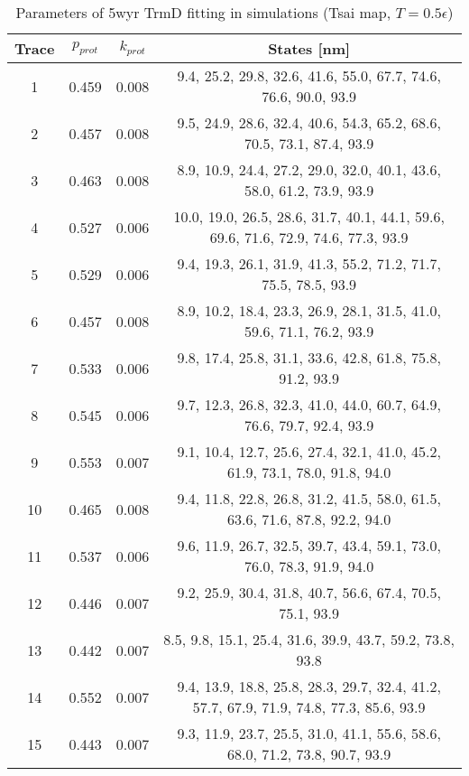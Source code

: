 \begin{table}
    \tiny
    \centering
    \caption{Parameters of 5wyr TrmD fitting in simulations (Tsai map, $T=0.5\epsilon$)}
    \label{tab:5wyr-pa-parameters}
    \begin{tabular}{c|c|c|c}
        \textbf{Trace} & \textbf{$p_{prot}$} & \textbf{$k_{prot}$} & \textbf{States [nm]}\\\hline
        1 & 0.459 & 0.008 & 9.4, 25.2, 29.8, 32.6, 41.6, 55.0, 67.7, 74.6, 76.6, 90.0, 93.9\\
        2 & 0.457 & 0.008 & 9.5, 24.9, 28.6, 32.4, 40.6, 54.3, 65.2, 68.6, 70.5, 73.1, 87.4, 93.9\\
        3 & 0.463 & 0.008 & 8.9, 10.9, 24.4, 27.2, 29.0, 32.0, 40.1, 43.6, 58.0, 61.2, 73.9, 93.9\\
        4 & 0.527 & 0.006 & 10.0, 19.0, 26.5, 28.6, 31.7, 40.1, 44.1, 59.6, 69.6, 71.6, 72.9, 74.6, 77.3, 93.9\\
        5 & 0.529 & 0.006 & 9.4, 19.3, 26.1, 31.9, 41.3, 55.2, 71.2, 71.7, 75.5, 78.5, 93.9\\
        6 & 0.457 & 0.008 & 8.9, 10.2, 18.4, 23.3, 26.9, 28.1, 31.5, 41.0, 59.6, 71.1, 76.2, 93.9\\
        7 & 0.533 & 0.006 & 9.8, 17.4, 25.8, 31.1, 33.6, 42.8, 61.8, 75.8, 91.2, 93.9\\
        8 & 0.545 & 0.006 & 9.7, 12.3, 26.8, 32.3, 41.0, 44.0, 60.7, 64.9, 76.6, 79.7, 92.4, 93.9\\
        9 & 0.553 & 0.007 & 9.1, 10.4, 12.7, 25.6, 27.4, 32.1, 41.0, 45.2, 61.9, 73.1, 78.0, 91.8, 94.0\\
        10 & 0.465 & 0.008 & 9.4, 11.8, 22.8, 26.8, 31.2, 41.5, 58.0, 61.5, 63.6, 71.6, 87.8, 92.2, 94.0\\
        11 & 0.537 & 0.006 & 9.6, 11.9, 26.7, 32.5, 39.7, 43.4, 59.1, 73.0, 76.0, 78.3, 91.9, 94.0\\
        12 & 0.446 & 0.007 & 9.2, 25.9, 30.4, 31.8, 40.7, 56.6, 67.4, 70.5, 75.1, 93.9\\
        13 & 0.442 & 0.007 & 8.5, 9.8, 15.1, 25.4, 31.6, 39.9, 43.7, 59.2, 73.8, 93.8\\
        14 & 0.552 & 0.007 & 9.4, 13.9, 18.8, 25.8, 28.3, 29.7, 32.4, 41.2, 57.7, 67.9, 71.9, 74.8, 77.3, 85.6, 93.9\\
        15 & 0.443 & 0.007 & 9.3, 11.9, 23.7, 25.5, 31.0, 41.1, 55.6, 58.6, 68.0, 71.2, 73.8, 90.7, 93.9\\
    \end{tabular}
\end{table}

